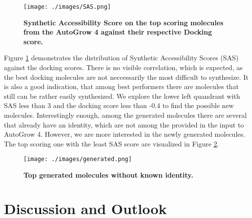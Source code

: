 \documentclass[11pt, letterpaper, titlepage]{article}
\begin{document}
\begin{figure}[h!]

\centering

\texttt{[image: ./images/SAS.png]} 

\caption{\textbf{Synthetic Accessibility Score on the top scoring molecules from the AutoGrow 4 against their respective Docking score.}} 

\label{fig:sas} 

\end{figure} 


\noindent Figure \ref{fig:sas} demonstrates the distribution of Synthetic Accessibility Scores (SAS) against the docking scores. There is no visible correlation, which is expected, as the best docking molecules are not neccessarily the most difficult to synthesize. It is also a good indication, that among best performers there are molecules that still can be rather easily synthesized. We explore the lower left quandrant with SAS less than 3 and the docking score less than -0.4 to find the possible new molecules. 
\newline \newline
Interestingly enough, among the generated molecules there are several that already have an identity, which are not among the provided in the input to AutoGrow 4. However, we are more interested in the newly generated molecules. The top scoring one with the least SAS score are visualized in Figure \ref{fig:generated}.

\begin{figure}[h!]

\centering

\texttt{[image: ./images/generated.png]} 

\caption{\textbf{Top generated molecules without known identity.}} 

\label{fig:generated} 

\end{figure} 
\FloatBarrier

\section{Discussion and Outlook}
\end{document}
